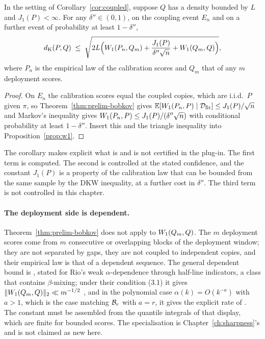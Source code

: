 \documentclass[../../../main.tex]{subfiles}
\begin{document}
\begin{corollary}\label{cor:plugin}
In the setting of Corollary~\ref{cor:coupled}, suppose $Q$ has a density bounded by $L$ and $J_1(P)<\infty$. For any $\delta''\in(0,1)$, on the coupling event $E_n$ and on a further event of probability at least $1-\delta''$,
\[
d_{\mathrm{K}}(P,Q)\;\le\;\sqrt{2L\Big(W_1(P_n,Q_m)+\frac{J_1(P)}{\delta''\sqrt n}+W_1(Q_m,Q)\Big)} ,
\]
where $P_n$ is the empirical law of the calibration scores and $Q_m$ that of any $m$ deployment scores.
\end{corollary}

\begin{proof}
On $E_n$ the calibration scores equal the coupled copies, which are i.i.d.\ $P$ given $\pi$, so Theorem~\ref{thm:prelim-bobkov} gives $\mathbb{E}[W_1(P_n,P)\mid\mathcal D_{\mathrm{fit}}]\le J_1(P)/\sqrt n$ and Markov's inequality gives $W_1(P_n,P)\le J_1(P)/(\delta''\sqrt n)$ with conditional probability at least $1-\delta''$. Insert this and the triangle inequality into Proposition~\ref{prop:w1}.
\end{proof}

The corollary makes explicit what is and is not certified in the plug-in. The first term is computed. The second is controlled at the stated confidence, and the constant $J_1(P)$ is a property of the calibration law that can be bounded from the same sample by the DKW inequality, at a further cost in $\delta''$. The third term is not controlled in this chapter.

\paragraph{The deployment side is dependent.} Theorem~\ref{thm:prelim-bobkov} does not apply to $W_1(Q_m,Q)$. The $m$ deployment scores come from $m$ consecutive or overlapping blocks of the deployment window; they are not separated by gaps, they are not coupled to independent copies, and their empirical law is that of a dependent sequence. The general dependent bound is \citep[Prop.~3.2, eqs.~(3.7)--(3.8)]{dedecker2017}, stated for Rio's weak $\alpha$-dependence through half-line indicators, a class that contains $\beta$-mixing; under their condition (3.1) it gives $\|W_1(Q_m,Q)\|_2\ll m^{-1/2}$ \citep[Remark~3.4(1)]{dedecker2017}, and in the polynomial case $\alpha(k)=O(k^{-a})$ with $a>1$, which is the case matching $\mathcal B_{r}$ with $a=r$, it gives the explicit rate of \citep[Remark~3.4(2), eq.~(3.12)]{dedecker2017}. The constant must be assembled from the quantile integrals of that display, which are finite for bounded scores. The specialisation is Chapter~\ref{ch:sharpness}'s and is not claimed as new here.
\end{document}
